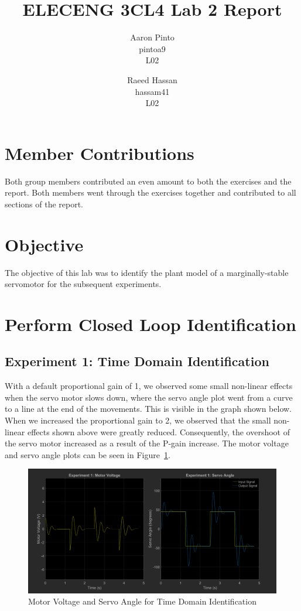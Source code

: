 \documentclass[12pt]{article}
\title{ELECENG 3CL4 Lab 2 Report}
\author{
    Aaron Pinto \\
    pintoa9 \\
    L02
    \and
    Raeed Hassan \\
    hassam41 \\
    L02
}
\begin{document}
\maketitle
\clearpage

\section*{Member Contributions}
Both group members contributed an even amount to both the exercises and the report. Both members went through the exercises together and contributed to all sections of the report.

\section*{Objective} %
The objective of this lab was to identify the plant model of a marginally-stable servomotor for the subsequent experiments.

\clearpage
\setcounter{section}{2}
\section{Perform Closed Loop Identification}
\subsection{Experiment 1: Time Domain Identification}
With a default proportional gain of 1, we observed some small non-linear effects when the servo motor slows down, where the servo angle plot went from a curve to a line at the end of the movements. This is visible in the graph shown below.
When we increased the proportional gain to 2, we observed that the small non-linear effects shown above were greatly reduced. Consequently, the overshoot of the servo motor increased as a result of the P-gain increase. The motor voltage and servo angle plots can be seen in Figure~\ref{fig:exp1}.
\begin{figure}[h!]
    \centering
    \includegraphics[width=\textwidth]{exp1}
    \caption{\label{fig:exp1}Motor Voltage and Servo Angle for Time Domain Identification}
\end{figure}
\end{document}
